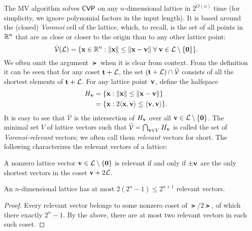 \documentclass[11pt]{article}
\begin{document}
\newcommand{\Vbar}{\ensuremath{\bar{\mathcal{V}}}}

The MV algorithm solves $\mathsf{CVP}$ on any $n$-dimensional lattice in
$2^{O(n)}$ time (for simplicity, we ignore polynomial factors in the
input length). It is based around the (closed) \emph{Voronoi} cell of
the lattice, which, to recall, is the set of all points in $\mathbb{R}^{n}$
that are as close or closer to the origin than to any other lattice
point:
\begin{equation}
  \label{eq:voronoi}
  \Vbar(\lat) = \set{\vecx \in \R^n : \length{\vecx} \leq
    \length{\vecx - \vecv} \; \forall\;
    \vecv \in \lat \setminus \set{\veczero} }.
\end{equation}
We often omit the argument $\lat$ when it is clear from context. From
the definition it can be seen that for any coset $\mathbf{t}+\mathcal{L}$, the set
$(\vect+\lat) \cap \Vbar$ consists of all the shortest elements of
$\mathbf{t}+\mathcal{L}$. For any lattice point~$\mathbf{v}$, define the halfspace
\begin{align}
  \label{eq:Hv}
  H_{\mathbf{v}}
  &= \{ \mathbf{x} : \lVert\mathbf{x}\rVert \leq \lVert\mathbf{x}-\mathbf{v}\rVert\} \\
  &= \{\mathbf{x} : 2\langle\mathbf{x}, \mathbf{v}\rangle \leq \langle\mathbf{v}, \mathbf{v}\rangle\}.
\end{align}
It is easy to see that $\Vbar$ is the intersection of $H_{\mathbf{v}}$ over
all $\mathbf{v} \in \mathcal{L} \setminus \{\mathbf{0}\}$. The minimal set $V$ of
lattice vectors such that $\Vbar = \bigcap_{\vecv \in V} H_{\vecv}$ is
called the set of \emph{Voronoi-relevant} vectors; we often call them
\emph{relevant} vectors for short. The following characterizes the
relevant vectors of a lattice:

\begin{fact}[Voronoi]
  \label{fact:voronoi}
  A nonzero lattice vector $\mathbf{v} \in \mathcal{L} \setminus \{\mathbf{0}\}$
  is relevant if and only if $\pm \mathbf{v}$ are the only shortest vectors
  in the coset $\mathbf{v} + 2\mathcal{L}$.
\end{fact}

\begin{corollary}
  An $n$-dimensional lattice has at most $2(2^{n}-1) \leq 2^{n+1}$
  relevant vectors.
\end{corollary}

\begin{proof}
  Every relevant vector belongs to some nonzero coset of $\lat/2\lat$,
  of which there exactly $2^{n}-1$. By the above, there are at most
  two relevant vectors in each such coset.
\end{proof}
\end{document}
